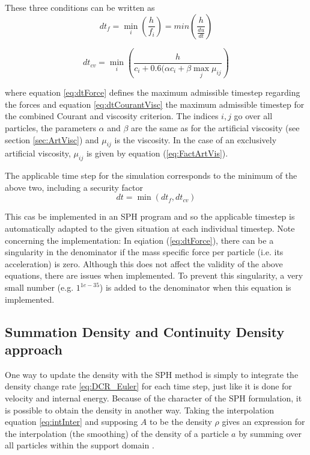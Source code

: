 \documentclass{report}
\begin{document}
These three conditions can be written as \cite{Monaghan1989,Monaghan1992}
\begin{equation}
\label{eq:dtForce}
 dt_f=\min_i(\frac{h}{f_i})=min(\frac{h}{\frac{du}{dt}})
\end{equation}

\begin{equation}
\label{eq:dtCourantVisc}
 dt_{cv}=\min_i(\frac{h}{c_i+0.6(\alpha c_i+\beta \max_j \mu_{ij}})
\end{equation}

where equation \ref{eq:dtForce} defines the maximum admissible timestep regarding the forces and equation \ref{eq:dtCourantVisc} the maximum admissible timestep for the combined Courant and viscosity criterion. The indices $i,j$ go over all particles, the parameters $\alpha$ and $\beta$ are the same as for the artificial viscosity (see section \ref{sec:ArtVisc}) and $\mu_{ij}$ is the viscosity. In the case of an exclusively artificial viscosity, $\mu_{ij}$ is given by equation (\ref{eq:FactArtVis}).

The applicable time step for the simulation corresponds to the minimum of the above two, including a security factor 
\begin{equation}
\label{eq:dt}
dt=\min(dt_f,dt_{cv})
\end{equation}

This cas be implemented in an SPH program and so the applicable timestep is automatically adapted to the given situation at each individual timestep. 
Note concerning the implementation: In eqiation (\ref{eq:dtForce}), there can be a singularity in the denominator if the mass specific force per particle (i.e. its acceleration) is zero. Although this does not affect the validity of the above equations, there are issues when implemented. To prevent this singularity, a very small number (e.g. $1^{1e-35}$) is added to the denominator when this equation is implemented.


\subsection{Summation Density and Continuity Density approach}
\label{sec:DensCalcMode}
One way to update the density with the SPH method is simply to integrate the density 
change rate \ref{eq:DCR_Euler} for each time step, just like it is done for velocity 
and internal energy. Because of the character of the SPH formulation, it is  
possible to obtain the density in another way. Taking the interpolation equation 
\ref{eq:intInter} and supposing $A$ to be the density $\rho$ gives an expression for 
the interpolation (the smoothing) of the density of a particle $a$ by summing over 
all particles within the support domain \cite{Monaghan2005}.
\end{document}

